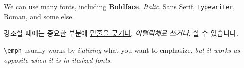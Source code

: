 \documentclass{oblivoir}
\begin{document}
	We can use many fonts, including \textbf{Boldface},
	\textit{Italic}, \textsf{Sans Serif}, 
	\texttt{Typewriter}, \textrm{Roman}, 
	and some else.
	
	강조할 때에는 중요한 부분에 
	\underline{밑줄을 긋거나}, 
	\emph{이탤릭체로 쓰거나},
	할 수 있습니다.
	
	\verb|\emph| usually works by \emph{italizing} 
	what you want to emphasize, 
	\textit{but it works as opposite 
	when it is in \emph{italized} fonts.}
\end{document}
